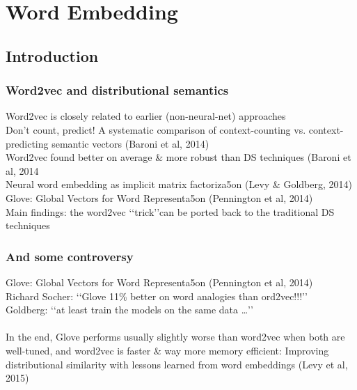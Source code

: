 \chapter{Word Embedding}
\label{cha:embedi}

\section{Introduction}

\subsection{Word2vec and distributional semantics}
Word2vec is closely related to earlier (non-neural-net) approaches\\

Don\rq t count, predict! A systematic comparison of context-counting vs. context-predicting semantic vectors (Baroni et al, 2014)\\

Word2vec found better on average \& more robust than DS techniques (Baroni et al, 2014\\

Neural word embedding as implicit matrix factoriza5on (Levy \& Goldberg, 2014) \\

Glove: Global Vectors for Word Representa5on (Pennington et al, 2014)\\

Main findings: the word2vec \lq\lq trick\rq\rq can be ported back to the traditional DS techniques\\

\subsection{And some controversy}
Glove: Global Vectors for Word Representa5on (Pennington et al, 2014)\\

Richard Socher: \lq\lq Glove 11\% better on word analogies than ord2vec!!!\rq\rq\\

Goldberg: \lq\lq at least train the models on the same data \ldots\rq\rq\\
\\

In the end, Glove performs usually slightly worse than word2vec when both are well-tuned, and word2vec is faster \& way more memory efficient: Improving distributional similarity with lessons learned from word embeddings (Levy et al, 2015) 


